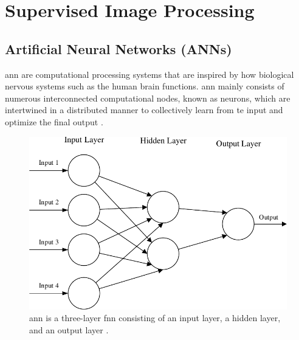 

\section{Supervised Image Processing}

\subsection{Artificial Neural Networks (ANNs)}

\gls{ann} are computational processing systems that are inspired by how biological nervous systems such as the human brain functions. \gls{ann} mainly consists of numerous interconnected computational nodes, known as neurons, which are intertwined in a distributed manner to collectively learn from te input and optimize the final output \cite{oshea2015introductionconvolutionalneuralnetworks}.

\begin{figure}[ht!]
    \centering
    \includegraphics[width=1\linewidth]{Images/ann_architecture.pdf}
    \caption{\gls{ann} is a three-layer \gls{fnn} consisting of an input layer, a hidden layer, and an output layer \cite{oshea2015introductionconvolutionalneuralnetworks}.}
    \label{fig:ann architecture}
\end{figure}

